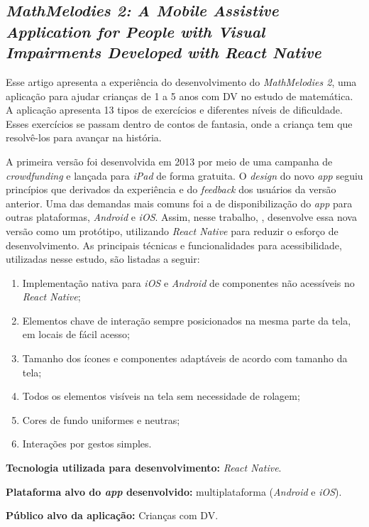 \subsection{\emph{MathMelodies 2: A Mobile Assistive Application for People with Visual Impairments Developed with React Native}}

Esse artigo apresenta a experiência do desenvolvimento do \emph{MathMelodies 2}, uma aplicação para ajudar crianças de 1 a 5 anos com DV no estudo de matemática.
A aplicação apresenta 13 tipos de exercícios e diferentes níveis de dificuldade.
Esses exercícios se passam dentro de contos de fantasia, onde a criança tem que resolvê-los para avançar na história.

A primeira versão foi desenvolvida em 2013 por meio de uma campanha de \emph{crowdfunding} e lançada para \emph{iPad} de forma gratuita.
O \emph{design} do novo \emph{app} seguiu princípios que derivados da experiência e do \emph{feedback} dos usuários da versão anterior.
Uma das demandas mais comuns foi a de disponibilização do \emph{app} para outras plataformas, \emph{Android} e \emph{iOS}.
Assim, nesse trabalho, , desenvolve essa nova versão como um protótipo, utilizando \emph{React Native} para reduzir o esforço de desenvolvimento.
As principais técnicas e funcionalidades para acessibilidade, utilizadas nesse estudo, são listadas a seguir:

\begin{enumerate}
    \item Implementação nativa para \emph{iOS} e \emph{Android} de componentes não acessíveis no \emph{React Native};
    \item Elementos chave de interação sempre posicionados na mesma parte da tela, em locais de fácil acesso;
    \item Tamanho dos ícones e componentes adaptáveis de acordo com tamanho da tela;
    \item Todos os elementos visíveis na tela sem necessidade de rolagem;
    \item Cores de fundo uniformes e neutras;
    \item Interações por gestos simples.
\end{enumerate}

\textbf{Tecnologia utilizada para desenvolvimento:} \emph{React Native}.

\textbf{Plataforma alvo do \emph{app} desenvolvido:} multiplataforma (\emph{Android} e \emph{iOS}).

\textbf{Público alvo da aplicação:} Crianças com DV\@.

